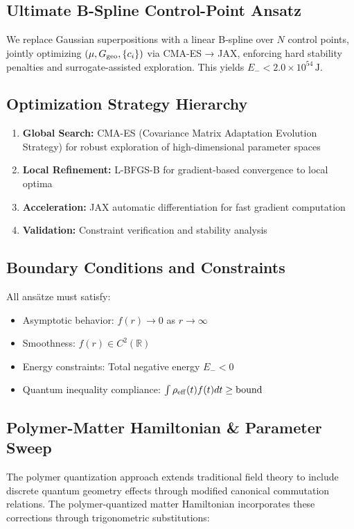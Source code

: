 \documentclass[11pt]{article}
\begin{document}
\subsection*{Ultimate B-Spline Control-Point Ansatz}
We replace Gaussian superpositions with a linear B-spline over \(N\) control points, jointly optimizing \((\mu,G_{\rm geo},\{c_i\})\) via CMA-ES → JAX, enforcing hard stability penalties and surrogate-assisted exploration. This yields \(E_-<2.0\times10^{54}\,\mathrm{J}\).

\subsection*{Optimization Strategy Hierarchy}
\begin{enumerate}
\item \textbf{Global Search:} CMA-ES (Covariance Matrix Adaptation Evolution Strategy) for robust exploration of high-dimensional parameter spaces
\item \textbf{Local Refinement:} L-BFGS-B for gradient-based convergence to local optima
\item \textbf{Acceleration:} JAX automatic differentiation for fast gradient computation
\item \textbf{Validation:} Constraint verification and stability analysis
\end{enumerate}

\subsection*{Boundary Conditions and Constraints}
All ansätze must satisfy:
\begin{itemize}
\item Asymptotic behavior: $f(r) \to 0$ as $r \to \infty$
\item Smoothness: $f(r) \in C^2(\mathbb{R})$
\item Energy constraints: Total negative energy $E_- < 0$
\item Quantum inequality compliance: $\int \rho_{\rm eff}(t)f(t)dt \geq \text{bound}$
\end{itemize}

\subsection*{Polymer-Matter Hamiltonian \& Parameter Sweep}

The polymer quantization approach extends traditional field theory to include discrete quantum geometry effects through modified canonical commutation relations. The polymer-quantized matter Hamiltonian incorporates these corrections through trigonometric substitutions:
\end{document}
